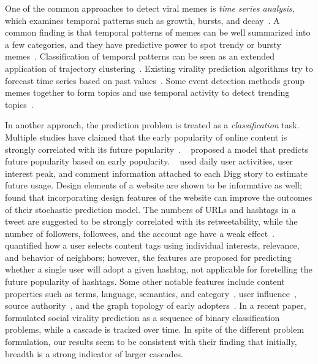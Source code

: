 \documentclass[letterpaper]{article}
\begin{document}
One of the common approaches to detect viral memes is \emph{time series analysis}, which examines temporal patterns such as growth, bursts, and decay~\cite{wu_novelty_2007,romero_differences_2011,asur_trends_2011}. A common finding is that temporal patterns of memes can be well summarized into a few categories, and they have predictive power to spot trendy or bursty memes~\cite{Yang2011temporal,Cattuto2012WWW}. Classification of temporal patterns can be seen as an extended application of trajectory clustering~\cite{Gaffney1999KDD,Lee2007TrajClus}.  Existing virality prediction algorithms try to forecast time series based on past values~\cite{MacNames1998,Lenser2005ICRA,Kaltenbrunner2007Slashdot}.  
Some event detection methods group memes together to form topics and use temporal activity to detect trending topics~\cite{Becker2011icwsm,cataldi2010}.


In another approach, the prediction problem is treated as a
\emph{classification} task. Multiple studies have claimed that the early popularity
of online content is strongly correlated with its future
popularity~\cite{Jamali2009digging,Szabo2010pred,Lerman2010www}. %
\citeauthor{Szabo2010pred}~ proposed a model that predicts future popularity based on early popularity. \citeauthor{Jamali2009digging}~ used daily user
activities, user interest peak, and comment information attached to each Digg
story to estimate future usage. Design elements of
a website are shown to be informative as well; \citeauthor{Lerman2010www}~ found that 
incorporating design features of the website can improve
the outcomes of their stochastic prediction model.
The numbers of URLs and hashtags in a tweet are suggested to be strongly correlated with its retweetability, while the number of followers, followees, and the account age have a weak effect~\cite{Suh2010}. \citeauthor{Mei2012tags}~ quantified how a user selects content tags using individual interests, relevance, and behavior of neighbors; however, the features are proposed for predicting whether a single user will adopt a given hashtag, not applicable for foretelling the future popularity of hashtags.
Some other notable features include content properties such as terms, language, semantics, and category~\cite{tsur2012wsdm}, user influence~\cite{bakshy_everyones_2011,Salganik2006music}, source authority~\cite{Bandari2012pred}, and the graph topology of early adopters~\cite{romero2011popu,ma2013predicting}.
%
In a recent paper, \citeauthor{Cheng14CanCascadesBePredicted}~ formulated social virality prediction as a sequence of binary classification problems, while a cascade is tracked over time. In spite of the different problem formulation, our results seem to be consistent with their finding that initially, breadth is a strong indicator of larger cascades.
\end{document}

